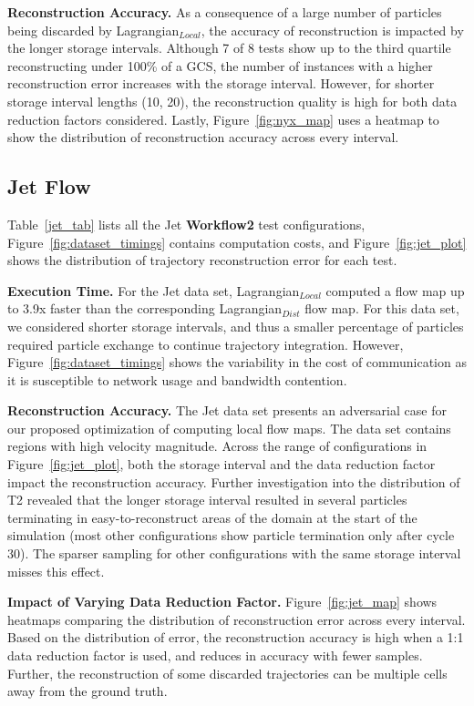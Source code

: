 \textbf{Reconstruction Accuracy.} As a consequence of a large number of particles being discarded by Lagrangian$_{Local}$, the accuracy of reconstruction is impacted by the longer storage intervals.
%
Although 7 of 8 tests show up to the third quartile reconstructing under 100\% of a GCS, the number of instances with a higher reconstruction error increases with the storage interval.
%
However, for shorter storage interval lengths (10, 20), the reconstruction quality is high for both data reduction factors considered. 
%
Lastly, Figure~\ref{fig:nyx_map} uses a heatmap to show the distribution of reconstruction accuracy across every interval. 




\subsection{Jet Flow}
\label{sec:jet}
Table~\ref{jet_tab} lists all the Jet \textbf{Workflow2} test configurations, Figure~\ref{fig:dataset_timings} contains computation costs, and Figure~\ref{fig:jet_plot} shows the distribution of trajectory reconstruction error for each test.
%

\textbf{Execution Time.} For the Jet data set, Lagrangian$_{Local}$ computed a flow map up to 3.9x faster than the corresponding Lagrangian$_{Dist}$ flow map.
%
For this data set, we considered shorter storage intervals, and thus a smaller percentage of particles required particle exchange to continue trajectory integration.
%
However, Figure~\ref{fig:dataset_timings} shows the variability in the cost of communication as it is susceptible to network usage and bandwidth contention.
%


\textbf{Reconstruction Accuracy.} The Jet data set presents an adversarial case for our proposed optimization of computing local flow maps.
%
The data set contains regions with high velocity magnitude.
%
Across the range of configurations in Figure~\ref{fig:jet_plot}, both the storage interval and the data reduction factor impact the reconstruction accuracy.
%
Further investigation into the distribution of T2 revealed that the longer storage interval resulted in several particles terminating in easy-to-reconstruct areas of the domain at the start of the simulation (most other configurations show particle termination only after cycle 30).
%
%
The sparser sampling for other configurations with the same storage interval misses this effect.



\textbf{Impact of Varying Data Reduction Factor.} Figure~\ref{fig:jet_map} shows heatmaps comparing the distribution of reconstruction error across every interval.
%
Based on the distribution of error, the reconstruction accuracy is high when a 1:1 data reduction factor is used, and reduces in accuracy with fewer samples.
%
Further, the reconstruction of some discarded trajectories can be multiple cells away from the ground truth. 
%
%


